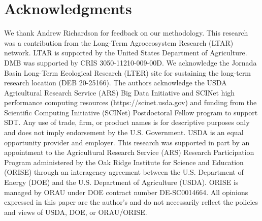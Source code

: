 \documentclass{article}
\begin{document}
\section*{Acknowledgments}
We thank Andrew Richardson for feedback on our methodology. This research was a contribution from the Long-Term Agroecosystem Research (LTAR) network. LTAR is supported by the United States Department of Agriculture. DMB was supported by CRIS 3050-11210-009-00D. We acknowledge the Jornada Basin Long-Term Ecological Research (LTER) site for sustaining the long-term research location (DEB 20-25166). The authors acknowledge the USDA Agricultural Research Service (ARS) Big Data Initiative and SCINet high performance computing resources (https://scinet.usda.gov) and funding from the Scientific Computing Initiative (SCINet) Postdoctoral Fellow program to support SDT. Any use of trade, firm, or product names is for descriptive purposes only and does not imply endorsement by the U.S. Government. USDA is an equal opportunity provider and employer.
This research was supported in part by an appointment to the Agricultural Research Service (ARS) Research Participation Program administered by the Oak Ridge Institute for Science and Education (ORISE) through an interagency agreement between the U.S. Department of Energy (DOE) and the U.S. Department of Agriculture (USDA). ORISE is managed by ORAU under DOE contract number DE-SC0014664.  All opinions expressed in this paper are the author's and do not necessarily reflect the policies and views of USDA, DOE, or ORAU/ORISE.




\end{document}
